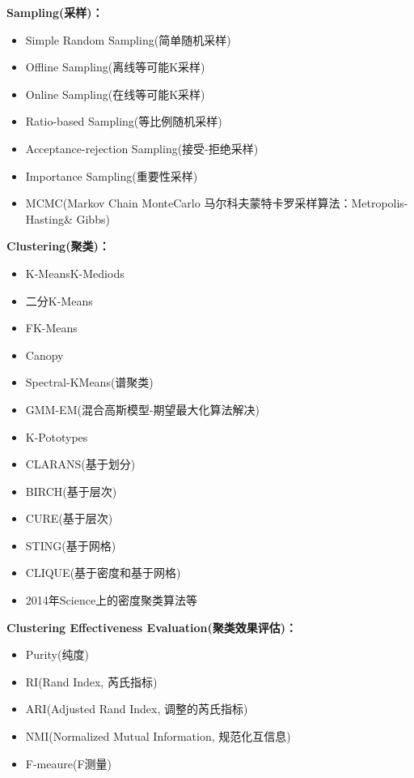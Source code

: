 \documentclass[10pt,a4paper]{ctexbook}
\begin{document}
\textbf{Sampling(采样)：}
\begin{itemize}
\item Simple Random Sampling(简单随机采样)
\item Offline Sampling(离线等可能K采样)
\item Online Sampling(在线等可能K采样)
\item Ratio-based Sampling(等比例随机采样)
\item Acceptance-rejection Sampling(接受-拒绝采样)
\item Importance Sampling(重要性采样)
\item MCMC(Markov Chain MonteCarlo 马尔科夫蒙特卡罗采样算法：Metropolis-Hasting\& Gibbs)
\end{itemize}

\textbf{Clustering(聚类)：}
\begin{itemize}
\item K-MeansK-Mediods
\item 二分K-Means
\item FK-Means
\item Canopy
\item Spectral-KMeans(谱聚类)
\item GMM-EM(混合高斯模型-期望最大化算法解决)
\item K-Pototypes
\item CLARANS(基于划分)
\item BIRCH(基于层次)
\item CURE(基于层次)
\item STING(基于网格)
\item CLIQUE(基于密度和基于网格)
\item 2014年Science上的密度聚类算法等
\end{itemize}

\textbf{Clustering Effectiveness Evaluation(聚类效果评估)：}
\begin{itemize}
\item Purity(纯度)
\item RI(Rand Index, 芮氏指标)
\item ARI(Adjusted Rand Index, 调整的芮氏指标)
\item NMI(Normalized Mutual Information, 规范化互信息)
\item F-meaure(F测量)
\end{itemize}
\end{document}
